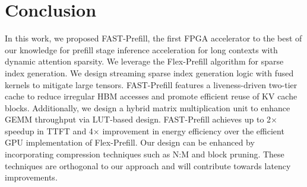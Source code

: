 \documentclass[conference]{IEEEtran}
\begin{document}
\section{Conclusion}
In this work, we proposed FAST-Prefill, the first FPGA accelerator to the best of our knowledge for prefill stage inference acceleration for long contexts with dynamic attention sparsity. We leverage the Flex-Prefill algorithm for sparse index generation. We design streaming sparse index generation logic with fused kernels to mitigate large tensors. FAST-Prefill features a liveness-driven two-tier cache to reduce irregular HBM accesses and promote efficient reuse of KV cache blocks. Additionally, we design a hybrid matrix multiplication unit to enhance GEMM throughput via LUT-based design. FAST-Prefill achieves up to 2$\times$ speedup in TTFT and 4$\times$ improvement in energy efficiency over the efficient GPU implementation of Flex-Prefill. Our design can be enhanced by incorporating compression techniques such as N:M and block pruning. These techniques are orthogonal to our approach and will contribute towards latency improvements. 

 



\end{document}
